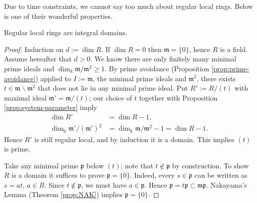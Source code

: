 Due to time constraints, we cannot say too much about regular local rings. Below is one of their wonderful properties.
\begin{theorem}\label{prop:regular-local-domain}
	Regular local rings are integral domains.
\end{theorem}
\begin{proof}
	Induction on $d := \dim R$. If $\dim R=0$ then $\mathfrak{m}=\{0\}$, hence $R$ is a field. Assume hereafter that $d > 0$. We know there are only finitely many minimal prime ideals and $\dim_\Bbbk \mathfrak{m}/\mathfrak{m}^2 \geq 1$. By prime avoidance (Proposition \ref{prop:prime-avoidance}) applied to $I := \mathfrak{m}$, the minimal prime ideals and $\mathfrak{m}^2$, there exists $t \in \mathfrak{m} \smallsetminus \mathfrak{m}^2$ that does not lie in any minimal prime ideal. Put $R' := R/(t)$ with maximal ideal $\mathfrak{m}' = \mathfrak{m}/(t)$; our choice of $t$ together with Proposition \ref{prop:system-parameter} imply
	\begin{align*}
		\dim R' & = \dim R - 1, \\
		\dim_\Bbbk \mathfrak{m}'/(\mathfrak{m}')^2 & = \dim_\Bbbk \mathfrak{m}/\mathfrak{m}^2 - 1 = \dim R - 1.
	\end{align*}
	Hence $R'$ is still regular local, and by induction it is a domain. This implies $(t)$ is prime.
	
	Take any minimal prime $\mathfrak{p}$ below $(t)$; note that $t \notin \mathfrak{p}$ by construction. To show $R$ is a domain it suffices to prove $\mathfrak{p}=\{0\}$. Indeed, every $s \in \mathfrak{p}$ can be written as $s=at$, $a \in R$. Since $t \notin \mathfrak{p}$, we must have $a \in \mathfrak{p}$. Hence $\mathfrak{p}=t\mathfrak{p} \subset \mathfrak{m}\mathfrak{p}$. Nakayama's Lemma (Theorem \ref{prop:NAK}) implies $\mathfrak{p} = \{0\}$.
\end{proof}

